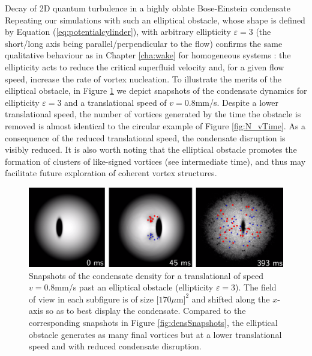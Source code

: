 \begin{chapter}{\label{cha:shin}Decay of 2D quantum turbulence in a highly oblate Bose-Einstein condensate}
Repeating our simulations with such an elliptical obstacle, whose shape is defined by Equation (\ref{eq:potentialcylinder}), with arbitrary ellipticity $\varepsilon=3$ (the short/long axis being parallel/perpendicular to the flow) confirms the same qualitative behaviour as in Chapter \ref{cha:wake} for homogeneous systems \citep{stagg_parker_14}: the ellipticity acts to reduce the critical superfluid velocity and, for a given flow speed, increase the rate of vortex nucleation. To illustrate the merits of the elliptical obstacle, in Figure \ref{fig:ellipse} we depict snapshots of the condensate dynamics for ellipticity $\varepsilon=3$ and a translational speed of $v=0.8$mm/s. Despite a lower translational speed, the number of vortices generated by the time the obstacle is removed is almost identical to the circular example of Figure \ref{fig:N_vTime}.  As a consequence of the reduced translational speed, the condensate disruption is visibly reduced. It is also worth noting that the elliptical obstacle promotes the formation of clusters of like-signed vortices (see intermediate time), and thus may facilitate future exploration of coherent vortex structures.


\begin{figure}
\centering
\includegraphics[width=0.9\linewidth]{shin/fig6.png}
\caption{\label{fig:ellipse} Snapshots of the condensate density for a translational of speed $v=0.8$mm/s past an elliptical obstacle (ellipticity $\varepsilon=3$). The field of view in each subfigure is of size $[170\mu$m$]^2$ and shifted along the $x$-axis so as to best display the condensate.  Compared to the corresponding snapshots in Figure \ref{fig:densSnapshots}, the elliptical obstacle generates as many final vortices but at a lower translational speed and with reduced condensate disruption.
}
\end{figure}

\end{chapter}
